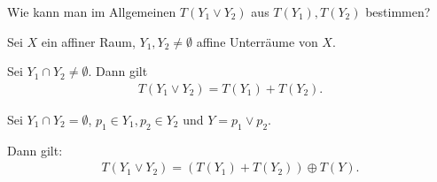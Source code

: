 \begin{frage*}
    Wie kann man im Allgemeinen \( T(Y_1\vee Y_2) \) aus \( T(Y_1),T(Y_2) \) bestimmen?
\end{frage*}
\begin{lemma}\label{verbindungsraum:translationen}
    Sei \( X \) ein affiner Raum, \( Y_1,Y_2\neq\emptyset \) affine Unterräume von \( X \).
    \begin{eigenschaftenenumerate}
        \item \label{verbindungsraum:translationen:schnitt_nicht_leer}Sei \( Y_1\cap Y_2\neq \emptyset \).
        Dann gilt
        \begin{align*}
            T(Y_1\vee Y_2)=T(Y_1)+T(Y_2).
        \end{align*}
        
        \item \label{verbindungsraum:translationen:schnitt_leer}Sei \( Y_1\cap Y_2=\emptyset \), \( p_1\in Y_1, p_2\in Y_2\) und \( Y=p_1\vee p_2 \).
        
        Dann gilt:
        \begin{align*}
            T(Y_1\vee Y_2)=(T(Y_1)+T(Y_2))\oplus T(Y).
        \end{align*}
    \end{eigenschaftenenumerate}
\end{lemma}

